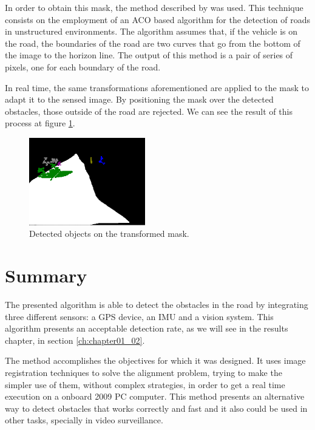 In order to obtain this mask, the method described by \cite{arnay2009applying} was used. This technique consists on the employment of an \ac{ACO} based algorithm for the detection of roads in unstructured environments. The algorithm assumes that, if the vehicle is on the road, the boundaries of the road are two curves that go from the bottom of the image to the horizon line. The output of this method is a pair of series of pixels, one for each boundary of the road.

In real time, the same transformations aforementioned are applied to the mask to adapt it to the sensed image. By positioning the mask over the detected obstacles, those outside of the road are rejected. We can see the result of this process at figure \ref{fig:cp01_mask_warped}.

\begin{figure}[h!]
\centering
\includegraphics[width=0.45\textwidth]{maskWarped}
\caption{Detected objects on the transformed mask.}\label{fig:cp01_mask_warped}
\end{figure}

\section{Summary}\label{ch:chapter01_03}

The presented algorithm is able to detect the obstacles in the road by integrating three different sensors: a \acs{GPS} device, an \ac{IMU} and a vision system. This algorithm presents an acceptable detection rate, as we will see in the results chapter, in section \ref{ch:chapter01_02}.

The method accomplishes the objectives for which it was designed. It uses image registration techniques to solve the alignment problem, trying to make the simpler use of them, without complex strategies, in order to get a real time execution on a onboard 2009 PC computer. This method presents an alternative way to detect obstacles that works correctly and fast and it also could be used in other tasks, specially in video surveillance.

